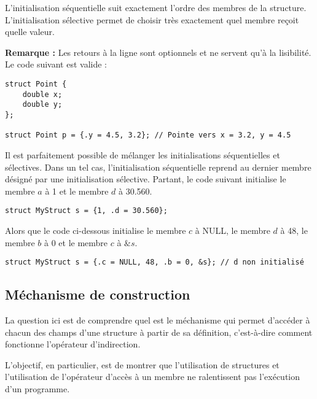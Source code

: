 \documentclass[../../../main.tex]{subfiles}
\begin{document}
L'initialisation séquentielle suit exactement l'ordre des membres de la structure.
\newline
L'initialisation sélective permet de choisir très exactement quel membre reçoit quelle valeur.
 
\textbf{Remarque :} Les retours à la ligne sont optionnels et ne servent qu'à la lisibilité. Le code suivant est valide :
\begin{verbatim}
struct Point {
	double x;
	double y;
};

struct Point p = {.y = 4.5, 3.2}; // Pointe vers x = 3.2, y = 4.5
\end{verbatim}
Il est parfaitement possible de mélanger les initialisations séquentielles et sélectives. Dans un tel cas, l’initialisation séquentielle reprend au dernier membre désigné par une initialisation sélective. Partant, le code suivant initialise le membre $a$ à 1 et le membre $d$ à 30.560.
\begin{verbatim}
struct MyStruct s = {1, .d = 30.560};
\end{verbatim}
Alors que le code ci-dessous initialise le membre $c$ à \textsf{NULL}, le membre $d$ à 48, le membre $b$ à 0 et le membre $c$ à $\&s$.
\begin{verbatim}
struct MyStruct s = {.c = NULL, 48, .b = 0, &s}; // d non initialisé
\end{verbatim}
\subsection{Méchanisme de construction}
La question ici est de comprendre quel est le méchanisme qui permet d'accéder à chacun des champs d'une structure à partir de sa définition, c'est-à-dire comment fonctionne l'opérateur d'indirection.

L'objectif, en particulier, est de montrer que l'utilisation de structures et l'utilisation de l'opérateur d'accès à un membre ne ralentissent pas l'exécution d'un programme.
\end{document}
